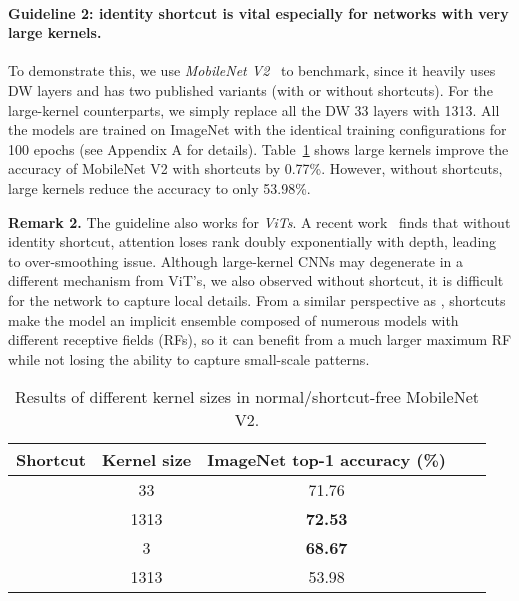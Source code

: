 \documentclass[10pt,twocolumn,letterpaper]{article}
\begin{document}
	\vspace{-0.15in}
	\paragraph{Guideline 2: identity shortcut is vital especially for networks with very large kernels.} 
To demonstrate this, we use \emph{MobileNet V2}~\cite{mbv2} to benchmark, since it heavily uses DW layers and has two published variants (with or without shortcuts). For the large-kernel counterparts, we simply replace all the DW 33 layers with 1313. All the models are trained on ImageNet with the identical training configurations for 100 epochs (see Appendix A for details). Table~\ref{table-mob2-shortcut} shows large kernels improve the accuracy of MobileNet V2 with shortcuts by 0.77\%. However, without shortcuts, large kernels reduce the accuracy to only 53.98\%. 


\noindent \textbf{Remark 2.} The guideline also works for \emph{ViTs}. A recent work~\cite{dong2021attention} finds that without identity shortcut, attention loses rank doubly exponentially with depth, leading to over-smoothing issue. Although large-kernel CNNs may degenerate in a different mechanism from ViT's, we also observed without shortcut, it is difficult for the network to capture local details. From a similar perspective as \cite{veit2016residual}, shortcuts make the model an implicit ensemble composed of numerous models with different receptive fields (RFs), so it can benefit from a much larger maximum RF while not losing the ability to capture small-scale patterns.

	
	\begin{table}
		\caption{Results of different kernel sizes in normal/shortcut-free MobileNet V2.}
		\label{table-mob2-shortcut}
		\vspace{-0.2in}
		\begin{center}
			\small
			\begin{tabular}{lcccc}
				\hline
				Shortcut 		& Kernel size		& ImageNet top-1 accuracy (\%)	\\
				\hline
				\checkmark		&	33		&	71.76		\\
				\checkmark		&	1313	&	\textbf{72.53}		\\
		        \hline
				&	3		&	\textbf{68.67}		\\
				&	1313	&	53.98		\\		
				\hline
			\end{tabular}
		\end{center}
		\vspace{-0.25in}
	\end{table}
	
\end{document}
